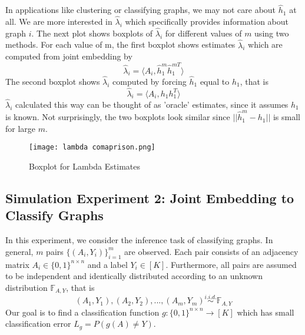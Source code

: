 \documentclass[10pt,journal,compsoc]{IEEEtran}
\begin{document}
\noindent In applications like clustering or classifying graphs, we may not care about $\hat{h}_1$ at all. We are more interested in $\hat{\lambda}_i$ which specifically provides information about graph $i$. The next plot shows boxplots of $\hat{\lambda}_i$ for different values of $m$ using two methods. For each value of m, the first boxplot shows estimates $\hat{\lambda}_i$ which are computed from joint embedding by
\[ \hat{\lambda}_i = \langle A_i,  \hat{h}^m_1 \hat{h}^{m T}_1 \rangle \]
The second boxplot shows $\hat{\lambda}_i$ computed by forcing $\hat{h}_1$ equal to $h_1$, that is 
\[ \hat{\lambda}_i = \langle A_i,  h_1 h_1^T \rangle \]
$\hat{\lambda}_i$ calculated this way can be thought of as 'oracle' estimates, since it assumes $h_1$ is known. Not surprisingly, the two boxplots look similar since $||\hat{h}^m_1-h_1||$ is small for large $m$.
\begin{figure}[!htbp]
	\centering
	\texttt{[image: lambda comaprison.png]}
	\caption{Boxplot for Lambda Estimates}
\end{figure}

\subsection{Simulation Experiment 2: Joint Embedding to Classify Graphs}
In this experiment, we consider the inference task of classifying graphs.  In general, $m$ pairs $\{(A_i,Y_i)\}_{i=1}^{m}$ are observed. Each pair consists of an adjacency matrix $A_i \in \{0,1\}^{n \times n}$ and a label $Y_i \in [K]$. Furthermore, all pairs are assumed to be independent and identically distributed according to an unknown distribution $\mathbb{F}_{A,Y}$, that is
\[(A_1,Y_1),(A_2,Y_2),...,(A_m,Y_m) \overset{i.i.d.}{\sim} \mathbb{F}_{A,Y} \] 
Our goal is to find a classification function $g:\{0,1\}^{n \times n} \rightarrow [K]$ which has small classification error $L_g=P(g(A)\neq Y)$. \\ 
\end{document}
